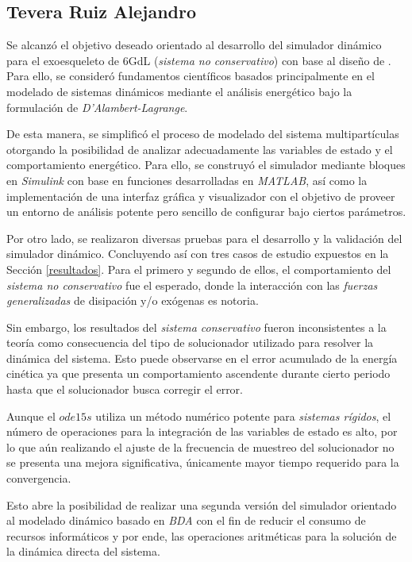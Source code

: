 \subsection{Tevera Ruiz Alejandro}
    \noindent Se alcanzó el objetivo deseado orientado al desarrollo del simulador dinámico
    para el exoesqueleto de 6GdL (\emph{sistema no conservativo}) con base al diseño de \cite{hexotrac}. Para ello, 
    se consideró fundamentos científicos basados principalmente en el modelado de sistemas 
    dinámicos mediante el análisis energético bajo la formulación de \emph{D'Alambert-Lagrange}. 

    De esta manera, se simplificó el proceso de modelado del sistema multipartículas otorgando la posibilidad
    de analizar adecuadamente las variables de estado y el comportamiento energético. Para ello, se construyó 
    el simulador mediante bloques en \emph{Simulink} con base en funciones desarrolladas en \emph{MATLAB}, así como la
    implementación de una interfaz gráfica y visualizador con el objetivo de proveer un entorno de análisis potente pero
    sencillo de configurar bajo ciertos parámetros. 

    Por otro lado, se realizaron diversas pruebas para el desarrollo y la validación del simulador dinámico. Concluyendo 
    así con tres casos de estudio expuestos en la Sección \ref{resultados}. Para el primero y segundo de ellos, el comportamiento
    del \emph{sistema no conservativo} fue el esperado, donde la interacción con las \emph{fuerzas generalizadas} de disipación y/o
    exógenas es notoria.
    
    Sin embargo, los resultados del \emph{sistema conservativo} fueron inconsistentes a la teoría como consecuencia del tipo de solucionador
    utilizado para resolver la dinámica del sistema. Esto puede observarse en el error acumulado de la energía cinética ya que 
    presenta un comportamiento ascendente durante cierto periodo hasta que el solucionador busca corregir el error.
    
    Aunque el $ode15s$ utiliza un método numérico potente para \emph{sistemas rígidos}, el número de operaciones para la integración
    de las variables de estado es alto, por lo que aún realizando el ajuste de la frecuencia de muestreo del solucionador no se presenta
    una mejora significativa, únicamente mayor tiempo requerido para la convergencia. 

    Esto abre la posibilidad de realizar una segunda versión del simulador orientado al modelado dinámico basado en \emph{BDA} con el
    fin de reducir el consumo de recursos informáticos y por ende, las operaciones aritméticas para la solución de la dinámica directa
    del sistema.